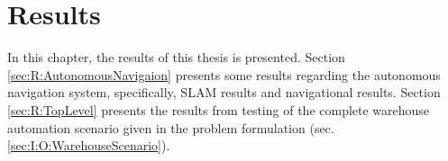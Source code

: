\chapter{Results}\label{sec:Results}
In this chapter, the results of this thesis is presented. Section \ref{sec:R:AutonomousNavigaion} presents some results regarding the autonomous navigation system, specifically, SLAM results and navigational results. %
Section \ref{sec:R:TopLevel} presents the results from testing of the complete warehouse automation scenario given in the problem formulation (sec. \ref{sec:I:O:WarehouseScenario}). 






